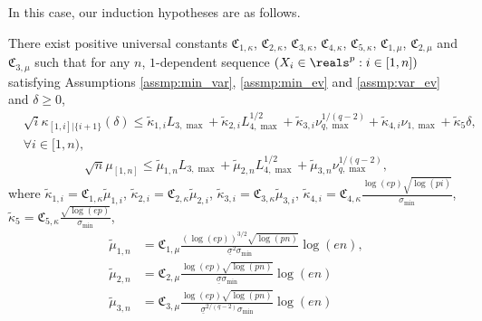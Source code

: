 \documentclass[aos]{imsart}
\begin{document}
\begin{appendix}
\medskip
{}
In this case, our induction hypotheses are as follows.
\begin{lemma}
    There exist positive universal constants $\mathfrak{C}_{1,\kappa}$, $\mathfrak{C}_{2,\kappa}$, $\mathfrak{C}_{3,\kappa}$, $\mathfrak{C}_{4,\kappa}$, $\mathfrak{C}_{5,\kappa}$, $\mathfrak{C}_{1,\mu}$, $\mathfrak{C}_{2,\mu}$ and $\mathfrak{C}_{3,\mu}$ such that for any $n$, $1$-dependent sequence $(X_i \in \reals^p: i \in [1,n])$ satisfying Assumptions \eqref{assmp:min_var}, \eqref{assmp:min_ev} and \eqref{assmp:var_ev} and $\delta \geq 0$,
    \begin{equation} \label{eq:hypothesis_AC_4N} \tag{HYP-AC-2}
    \begin{aligned}
        & \sqrt{i} \kappa_{[1,i]|\{i+1\}}(\delta)
        \leq 
        \tilde\kappa_{1,i} {L}_{3,\max}
        + \tilde\kappa_{2,i} {L}_{4,\max}^{1/2}
        + \tilde\kappa_{3,i} \nu_{q,\max}^{1/(q-2)}
        + \tilde\kappa_{4,i} \nu_{1,\max}
        + \tilde\kappa_{5} \delta, \\
        & \forall i \in [1,n),
    \end{aligned}
    \end{equation}
    \begin{equation} \label{eq:hypothesis_BE_4N} \tag{HYP-BE-2}
        \sqrt{n} \mu_{[1,n]}
        \leq \tilde\mu_{1,n} {L}_{3,\max}
        + \tilde\mu_{2,n} {L}_{4,\max}^{1/2}
        + \tilde\mu_{3,n} \nu_{q,\max}^{1/(q-2)},
    \end{equation}
    where $\tilde\kappa_{1,i} = \mathfrak{C}_{1,\kappa} \tilde\mu_{1,i}$, 
    $\tilde\kappa_{2,i} = \mathfrak{C}_{2,\kappa} \tilde\mu_{2,i}$, 
    $\tilde\kappa_{3,i} = \mathfrak{C}_{3,\kappa} \tilde\mu_{3,i}$,
    $\tilde\kappa_{4,i} = \mathfrak{C}_{4,\kappa} \frac{\log(ep)\sqrt{\log(pi)}}{\sigma_{\min}}$,
    $\tilde\kappa_{5} = \mathfrak{C}_{5,\kappa} \frac{\sqrt{\log(ep)}}{\sigma_{\min}}$,
    \begin{equation*}
    \begin{aligned}
        \tilde\mu_{1,n} 
        & = \mathfrak{C}_{1,\mu} \frac{(\log(ep))^{3/2}\sqrt{\log(pn)}}{\underline\sigma^2\sigma_{\min}} \log\left(e n\right), \\
        \tilde\mu_{2,n}
        & = \mathfrak{C}_{2,\mu} \frac{\log(ep)\sqrt{\log(pn)}}{\underline\sigma \sigma_{\min}} \log\left(e n\right) \\
        \tilde\mu_{3,n}
        & = \mathfrak{C}_{3,\mu} \frac{\log(ep)\sqrt{\log(pn)}}{\underline\sigma^{2/(q-2)} \sigma_{\min}} \log\left(e n\right)
    \end{aligned}
    \end{equation*}
\end{lemma}


\end{appendix}
\end{document}
